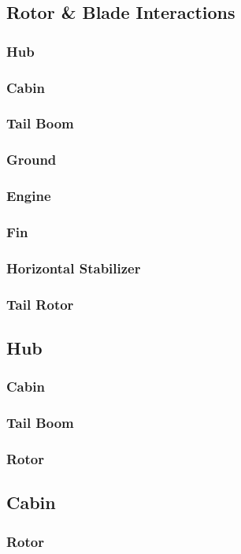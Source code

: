 \documentclass[12pt,a4paper]{article}
\begin{document}
\subsection{Rotor \& Blade Interactions}
\subsubsection{Hub}
\subsubsection{Cabin}
\subsubsection{Tail Boom}
\subsubsection{Ground}
\subsubsection{Engine}
\subsubsection{Fin}
\subsubsection{Horizontal Stabilizer}
\subsubsection{Tail Rotor}
\subsection{Hub}
\subsubsection{Cabin}
\subsubsection{Tail Boom}
\subsubsection{Rotor}
\subsection{Cabin}
\subsubsection{Rotor}
\end{document}

